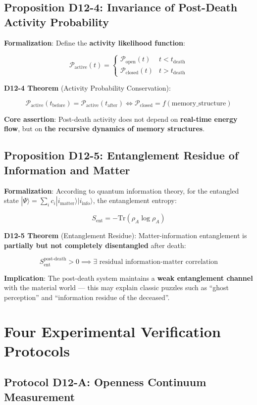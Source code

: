\documentclass[12pt,a4paper]{article}
\newcommand{\calPsi}{\Psi}
\newcommand{\Sent}{S_{\text{ent}}}
\newcommand{\calPopen}{\mathcal{P}_{\text{open}}}
\newcommand{\calPclosed}{\mathcal{P}_{\text{closed}}}
\newcommand{\calPactive}{\mathcal{P}_{\text{active}}}
\begin{document}
\subsection{Proposition D12-4: Invariance of Post-Death Activity Probability}

\textbf{Formalization}: Define the \textbf{activity likelihood function}:

$$\calPactive(t) = \begin{cases} \calPopen(t) & t < t_{\text{death}} \\ \calPclosed(t) & t > t_{\text{death}} \end{cases}$$

\textbf{D12-4 Theorem} (Activity Probability Conservation):

$$\calPactive(t_{\text{before}}) = \calPactive(t_{\text{after}}) \iff \calPclosed = f(\text{memory\_structure})$$

\textbf{Core assertion}: Post-death activity does not depend on \textbf{real-time energy flow}, but on \textbf{the recursive dynamics of memory structures}.

\subsection{Proposition D12-5: Entanglement Residue of Information and Matter}

\textbf{Formalization}: According to quantum information theory, for the entangled state $|\calPsi\rangle = \sum_i c_i |i_{\text{matter}}\rangle |i_{\text{info}}\rangle$, the entanglement entropy:

$$\Sent = -\text{Tr}(\rho_A \log \rho_A)$$

\textbf{D12-5 Theorem} (Entanglement Residue): Matter-information entanglement is \textbf{partially but not completely disentangled} after death:

$$\Sent^{\text{post-death}} > 0 \implies \exists \text{ residual information-matter correlation}$$

\textbf{Implication}: The post-death system maintains a \textbf{weak entanglement channel} with the material world --- this may explain classic puzzles such as ``ghost perception'' and ``information residue of the deceased''.

\section{Four Experimental Verification Protocols}

\subsection{Protocol D12-A: Openness Continuum Measurement}
\end{document}
